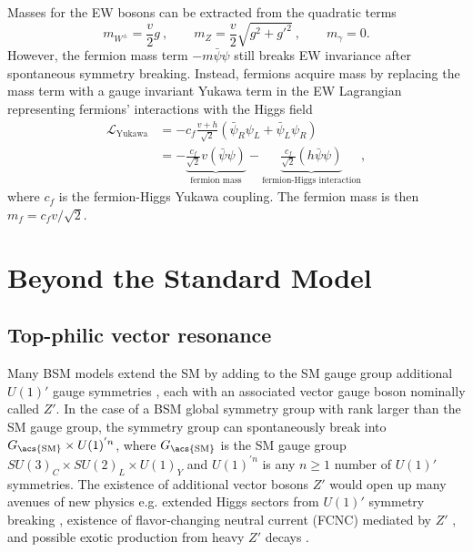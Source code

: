 \documentclass[../thesis.tex]{subfiles}
\begin{document}
Masses for the \acs{EW} bosons can be extracted from the quadratic terms
\begin{equation}
m_{W^\pm} = \frac{v}{2}g\:, \qquad m_Z = \frac{v}{2}\sqrt{g^2+g'^2}\:, \qquad m_\gamma = 0.
\end{equation}
However, the fermion mass term $-m\bar{\psi}\psi$ still breaks \acs{EW} invariance after spontaneous symmetry breaking. Instead, fermions acquire mass by replacing the mass term with a gauge invariant Yukawa term in the \acs{EW} Lagrangian representing fermions' interactions with the Higgs field \citep{theory:higgs_physics}
\begin{equation}
\begin{aligned}
\mathcal{L}_\text{Yukawa} 
&= -c_f\frac{v+h}{\sqrt{2}}\left(\bar{\psi}_R\psi_L+\bar{\psi}_L\psi_R\right) \\
&=
- \underbrace{\frac{c_f}{\sqrt{2}}v(\bar{\psi}\psi)}_\text{fermion mass}
- \underbrace{\frac{c_f}{\sqrt{2}}(h\bar{\psi}\psi)}_\text{fermion-Higgs interaction},
\end{aligned}
\end{equation}
where $c_f$ is the fermion-Higgs Yukawa coupling. The fermion mass is then $m_f = c_f v/\sqrt{2}$.

\section{Beyond the Standard Model}

\subsection{Top-philic vector resonance}
\label{sec:ttZp}
Many \acs{BSM} models extend the \acs{SM} by adding to the \acs{SM} gauge group additional $U(1)'$ gauge symmetries \citep{theory:Zp_U1p,theory:Zp_U1p_ee}, each with an associated vector gauge boson nominally called $Z'$. In the case of a \acs{BSM} global symmetry group with rank larger than the \acs{SM} gauge group, the symmetry group can spontaneously break into $G_\text{\acs{SM}}\times U(1)^{'n}$, where $G_\text{\acs{SM}}$ is the \acs{SM} gauge group $SU(3)_C \times SU(2)_L \times U(1)_Y$ and $U(1)^{'n}$ is any $n\geq 1$ number of $U(1)'$ symmetries. The existence of additional vector bosons $Z'$ would open up many avenues of new physics e.g. extended Higgs sectors from $U(1)'$ symmetry breaking \citep{theory:little_higgs,theory:little_higgs2}, existence of flavor-changing neutral current (FCNC) mediated by $Z'$ \citep{theory:fcnc}, and possible exotic production from heavy $Z'$ decays \citep{theory:Zp}.
\end{document}
